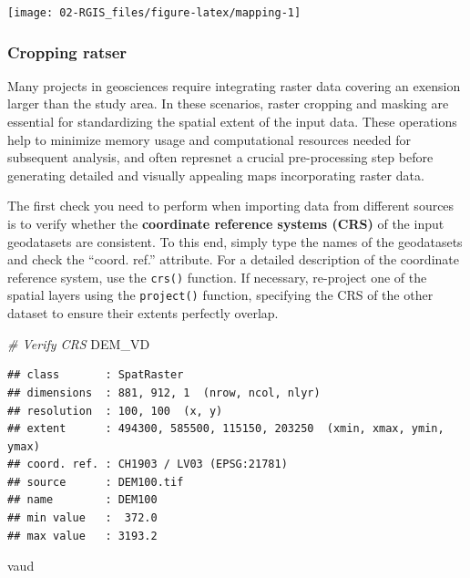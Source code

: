 \documentclass[
]{article}
\newenvironment{Shaded}{\begin{snugshade}}{\end{snugshade}}
\newcommand{\CommentTok}[1]{\textcolor[rgb]{0.56,0.35,0.01}{\textit{#1}}}
\newcommand{\NormalTok}[1]{#1}
\begin{document}
\begin{center}\texttt{[image: 02-RGIS\_files/figure-latex/mapping-1]} \end{center}

\subsubsection{Cropping ratser}\label{cropping-ratser}

Many projects in geosciences require integrating raster data covering an exension larger than the study area. In these scenarios, raster cropping and masking are essential for standardizing the spatial extent of the input data. These operations help to minimize memory usage and computational resources needed for subsequent analysis, and often represnet a crucial pre-processing step before generating detailed and visually appealing maps incorporating raster data.

The first check you need to perform when importing data from different sources is to verify whether the \textbf{coordinate reference systems (CRS)} of the input geodatasets are consistent. To this end, simply type the names of the geodatasets and check the ``coord. ref.'' attribute. For a detailed description of the coordinate reference system, use the \texttt{crs()} function. If necessary, re-project one of the spatial layers using the \texttt{project()} function, specifying the CRS of the other dataset to ensure their extents perfectly overlap.

\begin{Shaded}
\begin{Highlighting}[]
\CommentTok{\# Verify CRS}
\NormalTok{DEM\_VD}
\end{Highlighting}
\end{Shaded}

\begin{verbatim}
## class       : SpatRaster 
## dimensions  : 881, 912, 1  (nrow, ncol, nlyr)
## resolution  : 100, 100  (x, y)
## extent      : 494300, 585500, 115150, 203250  (xmin, xmax, ymin, ymax)
## coord. ref. : CH1903 / LV03 (EPSG:21781) 
## source      : DEM100.tif 
## name        : DEM100 
## min value   :  372.0 
## max value   : 3193.2
\end{verbatim}

\begin{Shaded}
\begin{Highlighting}[]
\NormalTok{vaud}
\end{Highlighting}
\end{Shaded}
\end{document}
